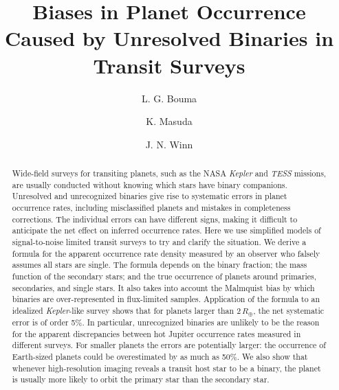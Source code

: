 \documentclass[12pt,modern]{aastex61}
\begin{document}
    
\title{ Biases in Planet Occurrence Caused by Unresolved Binaries in
        Transit Surveys }
%
%
\author[0000-0002-0514-5538]{L. G. Bouma}
\author[0000-0003-1298-9699]{K. Masuda}
\author[0000-0002-4265-047X]{J. N. Winn}
%
%
\begin{abstract}
%
Wide-field surveys for transiting planets, such as the NASA {\it
Kepler} and {\it TESS} missions, are usually conducted without
knowing which stars have binary companions. Unresolved and
unrecognized binaries give rise to systematic errors in planet
occurrence rates, including misclassified planets and mistakes in
completeness corrections.  The individual errors can have different
signs, making it difficult to anticipate the net effect on inferred
occurrence rates. Here we use simplified models of signal-to-noise
limited transit surveys to try and clarify the situation. We derive a
formula for the apparent occurrence rate density measured by an
observer who falsely assumes all stars are single. The formula depends
on the binary fraction; the mass function of the secondary stars; and
the true occurrence of planets around primaries, secondaries, and
single stars. It also takes into account the Malmquist bias by which
binaries are over-represented in flux-limited samples. Application of
the formula to an idealized {\it Kepler}-like survey shows that for
planets larger than 2\,$R_\oplus$, the net systematic error is of
order 5\%.  In particular, unrecognized binaries are unlikely to be
the reason for the apparent discrepancies between hot Jupiter
occurrence rates measured in different surveys.  For smaller planets
the errors are potentially larger: the occurrence of Earth-sized
planets could be overestimated by as much as 50\%. We also show that
whenever high-resolution imaging reveals a transit host star to be a
binary, the planet is usually more likely to orbit the primary star
than the secondary star.
%
\end{abstract}
%
%
%

\end{document}
